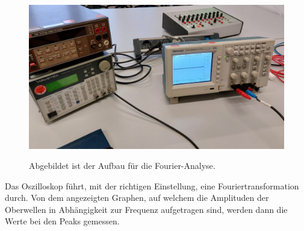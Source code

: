 % 

\begin{figure}[H]
    \includegraphics[width=\textwidth]{Bilder/analyse.jpg}
    \label{fig:analyse}
    \caption{Abgebildet ist der Aufbau für die Fourier-Analyse.}
\end{figure}

Das Oszilloskop führt, mit der richtigen Einstellung, eine Fouriertransformation durch.
Von dem angezeigten Graphen, auf welchem die Amplituden der Oberwellen in Abhängigkeit zur Frequenz aufgetragen sind, werden dann die Werte bei den Peaks gemessen.

